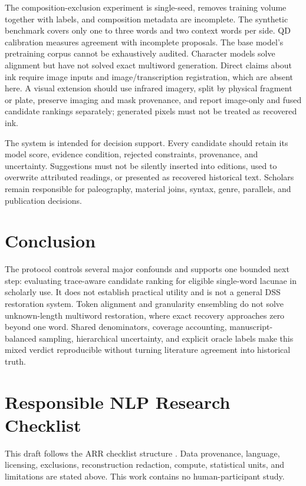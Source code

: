 \documentclass[10pt,twocolumn,a4paper]{article}
\begin{document}
The composition-exclusion experiment is single-seed, removes training volume together with labels, and composition metadata are incomplete. The synthetic benchmark covers only one to three words and two context words per side. QD calibration measures agreement with incomplete proposals. The base model's pretraining corpus cannot be exhaustively audited. Character models solve alignment but have not solved exact multiword generation. Direct claims about ink require image inputs and image/transcription registration, which are absent here. A visual extension should use infrared imagery, split by physical fragment or plate, preserve imaging and mask provenance, and report image-only and fused candidate rankings separately; generated pixels must not be treated as recovered ink.

The system is intended for decision support. Every candidate should retain its model score, evidence condition, rejected constraints, provenance, and uncertainty. Suggestions must not be silently inserted into editions, used to overwrite attributed readings, or presented as recovered historical text. Scholars remain responsible for paleography, material joins, syntax, genre, parallels, and publication decisions.

\section{Conclusion}

The protocol controls several major confounds and supports one bounded next step: evaluating trace-aware candidate ranking for eligible single-word lacunae in scholarly use. It does not establish practical utility and is not a general DSS restoration system. Token alignment and granularity ensembling do not solve unknown-length multiword restoration, where exact recovery approaches zero beyond one word. Shared denominators, coverage accounting, manuscript-balanced sampling, hierarchical uncertainty, and explicit oracle labels make this mixed verdict reproducible without turning literature agreement into historical truth.

\section*{Responsible NLP Research Checklist}

This draft follows the ARR checklist structure \cite{arrchecklist}. Data provenance, language, licensing, exclusions, reconstruction redaction, compute, statistical units, and limitations are stated above. This work contains no human-participant study.
\end{document}
